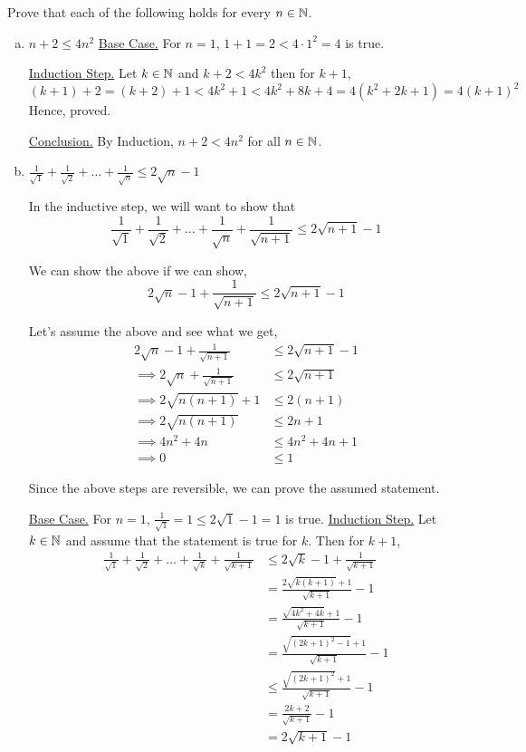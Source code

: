 \bp
Prove that each of the following holds for every $n \in \mathbb{N}$.
\begin{enumerate}[(a).]
	\item $n + 2 \leq 4n^2$
		\bs
		\underline{Base Case.} For $n = 1$, $1 + 1 = 2 < 4 \cdot 1^2 = 4$ is true.

		\underline{Induction Step.} Let $k \in \mathbb{N}$ and $k+2 < 4k^2$ then for $k+1$, 
		$$(k+1)+2 = (k+2)+1 < 4k^2 + 1 < 4k^2 + 8k + 4 = 4(k^2 + 2k + 1) = 4(k+1)^2$$
		Hence, proved.
		
		\underline{Conclusion.} By Induction, $n+2 < 4n^2$ for all $n \in \mathbb{N}$.
		\es

	\item $\displaystyle \frac{1}{\sqrt{1}} + \frac{1}{\sqrt{2}} + \ldots + \frac{1}{\sqrt{n}} \leq 2 \sqrt{n} - 1$
		\begin{scratch}
			In the inductive step, we will want to show that
			$$\frac{1}{\sqrt{1}} + \frac{1}{\sqrt{2}} + \ldots + \frac{1}{\sqrt{n}} + \frac{1}{\sqrt{n+1}} \leq 2 \sqrt{n+1} - 1$$

			We can show the above if we can show,
			$$2\sqrt{n} - 1 + \frac{1}{\sqrt{n+1}} \leq 2 \sqrt{n+1} - 1$$

			Let's assume the above and see what we get,
			\begin{align*}
				2\sqrt{n} - 1 + \frac{1}{\sqrt{n+1}} &\leq 2 \sqrt{n+1} - 1 \\
				\implies 2\sqrt{n} + \frac{1}{\sqrt{n+1}} &\leq 2 \sqrt{n+1}\\
				\implies 2\sqrt{n(n+1)} + 1 &\leq 2(n+1) \\
				\implies 2\sqrt{n(n+1)} &\leq 2n + 1 \\
				\implies 4n^2 + 4n &\leq 4n^2 + 4n + 1 \\
				\implies 0 &\leq 1
			\end{align*}

			Since the above steps are reversible, we can prove the assumed statement.
		\end{scratch}
		\bs
		\underline{Base Case.} For $n = 1$, $\frac{1}{\sqrt{1}} = 1 \leq 2 \sqrt{1} - 1 = 1$ is true.
		\underline{Induction Step.} Let $k \in \mathbb{N}$ and assume that the statement is true for $k$. Then for $k+1$, 
		\begin{align*}
			\frac{1}{\sqrt{1}} + \frac{1}{\sqrt{2}} + \ldots + \frac{1}{\sqrt{k}} + \frac{1}{\sqrt{k+1}} 
				& \leq 2 \sqrt{k} - 1 + \frac{1}{\sqrt{k+1}} \\
				& = \frac{2 \sqrt{k(k+1)} + 1}{\sqrt{k+1}} - 1 \\
				& = \frac{\sqrt{4k^2 + 4k} + 1}{\sqrt{k+1}} - 1 \\
				& = \frac{\sqrt{(2k+1)^2 - 1} + 1}{\sqrt{k+1}} - 1 \\
				& \leq \frac{\sqrt{(2k+1)^2} + 1}{\sqrt{k+1}} - 1 \\
				& = \frac{2k+2}{\sqrt{k+1}} - 1 \\
				& = 2\sqrt{k+1} - 1
		\end{align*}


\end{enumerate}
